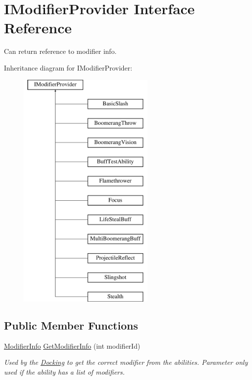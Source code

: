 \hypertarget{interface_i_modifier_provider}{}\section{I\+Modifier\+Provider Interface Reference}
\label{interface_i_modifier_provider}


Can return reference to modifier info.  


Inheritance diagram for I\+Modifier\+Provider\+:\begin{figure}[H]
\begin{center}
\leavevmode
\includegraphics[height=12.000000cm]{interface_i_modifier_provider}
\end{center}
\end{figure}
\subsection*{Public Member Functions}
\begin{DoxyCompactItemize}
\item 
\hyperlink{struct_modifier_info}{Modifier\+Info} \hyperlink{interface_i_modifier_provider_ac9efab639fbb30738379cd5886c1489f}{Get\+Modifier\+Info} (int modifier\+Id)
\begin{DoxyCompactList}\small\item\em Used by the \hyperlink{class_docking}{Docking} to get the correct modifier from the abilities. Parameter only used if the ability has a list of modifiers. \end{DoxyCompactList}\end{DoxyCompactItemize}


